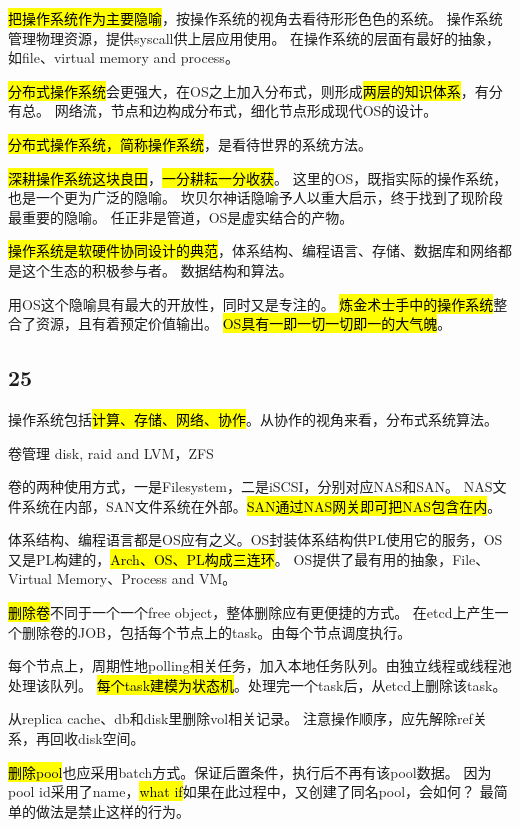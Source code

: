 \hrulefill

\hl{把操作系统作为主要隐喻}，按操作系统的视角去看待形形色色的系统。
操作系统管理物理资源，提供syscall供上层应用使用。
在操作系统的层面有最好的抽象，如file、virtual memory and process。

\hl{分布式操作系统}会更强大，在OS之上加入分布式，则形成\hl{两层的知识体系}，有分有总。
网络流，节点和边构成分布式，细化节点形成现代OS的设计。

\hl{分布式操作系统，简称操作系统}，是看待世界的系统方法。

\hl{深耕操作系统这块良田}，\hl{一分耕耘一分收获}。
这里的OS，既指实际的操作系统，也是一个更为广泛的隐喻。
坎贝尔神话隐喻予人以重大启示，终于找到了现阶段最重要的隐喻。
任正非是管道，OS是虚实结合的产物。

\hl{操作系统是软硬件协同设计的典范}，体系结构、编程语言、存储、数据库和网络都是这个生态的积极参与者。
数据结构和算法。

用OS这个隐喻具有最大的开放性，同时又是专注的。
\hl{炼金术士手中的操作系统}整合了资源，且有着预定价值输出。
\hl{OS具有一即一切一切即一的大气魄}。

\subsection{25}

操作系统包括\hl{计算、存储、网络、协作}。从协作的视角来看，分布式系统算法。

卷管理 disk, raid and LVM，ZFS

卷的两种使用方式，一是Filesystem，二是iSCSI，分别对应NAS和SAN。
NAS文件系统在内部，SAN文件系统在外部。\hl{SAN通过NAS网关即可把NAS包含在内}。

体系结构、编程语言都是OS应有之义。OS封装体系结构供PL使用它的服务，OS又是PL构建的，\hl{Arch、OS、PL构成三连环}。
OS提供了最有用的抽象，File、Virtual Memory、Process and VM。

\hrulefill

\hl{删除卷}不同于一个一个free object，整体删除应有更便捷的方式。
在etcd上产生一个删除卷的JOB，包括每个节点上的task。由每个节点调度执行。

每个节点上，周期性地polling相关任务，加入本地任务队列。由独立线程或线程池处理该队列。
\hl{每个task建模为状态机}。处理完一个task后，从etcd上删除该task。

从replica cache、db和disk里删除vol相关记录。
注意操作顺序，应先解除ref关系，再回收disk空间。

\hl{删除pool}也应采用batch方式。保证后置条件，执行后不再有该pool数据。
因为pool id采用了name，\hl{what if}如果在此过程中，又创建了同名pool，会如何？
最简单的做法是禁止这样的行为。

